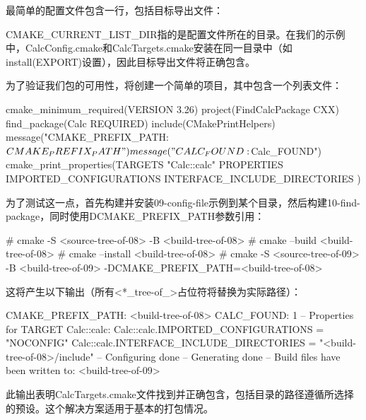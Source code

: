 最简单的配置文件包含一行，包括目标导出文件：



CMAKE\_CURRENT\_LIST\_DIR指的是配置文件所在的目录。在我们的示例中，CalcConfig.cmake和CalcTargets.cmake安装在同一目录中（如install(EXPORT)设置），因此目标导出文件将正确包含。

为了验证我们包的可用性，将创建一个简单的项目，其中包含一个列表文件：


\begin{cmake}
cmake_minimum_required(VERSION 3.26)
project(FindCalcPackage CXX)
find_package(Calc REQUIRED)
include(CMakePrintHelpers)
message("CMAKE_PREFIX_PATH: ${CMAKE_PREFIX_PATH}")
message("CALC_FOUND: ${Calc_FOUND}")
cmake_print_properties(TARGETS "Calc::calc" PROPERTIES
    IMPORTED_CONFIGURATIONS
    INTERFACE_INCLUDE_DIRECTORIES
)
\end{cmake}

为了测试这一点，首先构建并安装09-config-file示例到某个目录，然后构建10-find-package，同时使用DCMAKE\_PREFIX\_PATH参数引用：

\begin{shell}
# cmake -S <source-tree-of-08> -B <build-tree-of-08>
# cmake --build <build-tree-of-08>
# cmake --install <build-tree-of-08>
# cmake -S <source-tree-of-09> -B <build-tree-of-09>
        -DCMAKE_PREFIX_PATH=<build-tree-of-08>
\end{shell}

这将产生以下输出（所有<*\_tree-of\_>占位符将替换为实际路径）：

\begin{shell}
CMAKE_PREFIX_PATH: <build-tree-of-08>
CALC_FOUND: 1
--
Properties for TARGET Calc::calc:
   Calc::calc.IMPORTED_CONFIGURATIONS = "NOCONFIG"
   Calc::calc.INTERFACE_INCLUDE_DIRECTORIES = "<build-tree-of-08>/include"
-- Configuring done
-- Generating done
-- Build files have been written to: <build-tree-of-09>
\end{shell}

此输出表明CalcTargets.cmake文件找到并正确包含，包括目录的路径遵循所选择的预设。这个解决方案适用于基本的打包情况。



